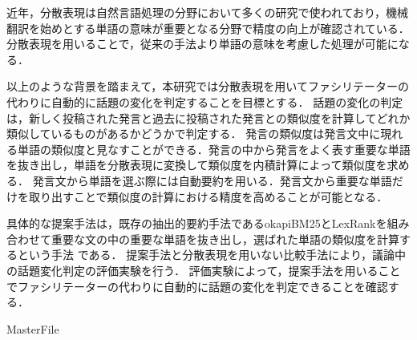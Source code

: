 近年，分散表現は自然言語処理の分野において多くの研究で使われており，機械翻訳を始めとする単語の意味が重要となる分野で精度の向上が確認されている．分散表現を用いることで，従来の手法より単語の意味を考慮した処理が可能になる．

以上のような背景を踏まえて，本研究では分散表現を用いてファシリテーターの代わりに自動的に話題の変化を判定することを目標とする．
話題の変化の判定は，新しく投稿された発言と過去に投稿された発言との類似度を計算してどれか類似しているものがあるかどうかで判定する．
発言の類似度は発言文中に現れる単語の類似度と見なすことができる．発言の中から発言をよく表す重要な単語を抜き出し，単語を分散表現に変換して類似度を内積計算によって類似度を求める．
%
発言文から単語を選ぶ際には自動要約を用いる．発言文から重要な単語だけを取り出すことで類似度の計算における精度を高めることが可能となる．

具体的な提案手法は，既存の抽出的要約手法であるokapiBM25とLexRankを組み合わせて重要な文の中の重要な単語を抜き出し，選ばれた単語の類似度を計算するという手法
である．
提案手法と分散表現を用いない比較手法により，議論中の話題変化判定の評価実験を行う．
評価実験によって，提案手法を用いることでファシリテーターの代わりに自動的に話題の変化を判定できることを確認する．%
%
 \begin{comment}
大規模な議論では意見を共有することは可能であるが，議論を整理させることや収束させることは難しい．以上から大規模意見集約システムCOLLAGREEが開発された．本システムではWeb上で適切に大規模な議論を行うことができるように議論をマネジメントするファシリテーターを導入した．
過去の実験ではファシリテーターの存在が議論の集約に大きな役割を果たしていることが認識されており，大規模な議論のためにファシリテータは必要である．しかし，議論の規模に伴って議論時間が長くなる傾向があり，同時にファシリテーターは常に議論の動向を見続ける必要がある．故に，議論の規模が大きくなればなるほどファシリテーターは長時間かつ大規模な議論の動向の監視によって大きな負担がかかる．大規模な議論が増加する傾向を踏まえるとファシリテーターにかかる負担を軽減する支援が必要となることは明白である．
また，近年自然言語処理の分野において分散表現が多くの研究で使われており，機械翻訳を始めとする複数の分野で精度の向上が確認されている．まだ適応されていない分野でも結果の向上が期待できる．
従って，本研究では負担軽減の１つとして分散表現を用いて議論中での話題の変化を人間の代わりに検知することでファシリテーターの負担を軽減することを目指す．
\end{comment}
\expandafter\ifx\csname MasterFile\endcsname\relax

\fi
